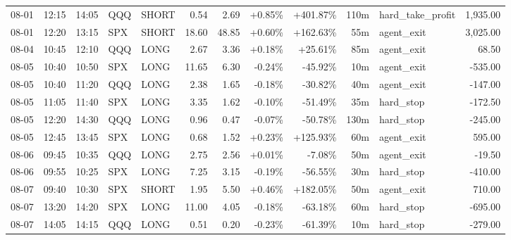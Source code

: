 \documentclass[11pt,a4paper,twoside]{article}
\begin{document}
\begin{center}
\begin{longtable}{>{\color{txtmain}}l l l l l r r r r r >{\color{txtmain}}l r}
08-01 & 12:15 & 14:05 & QQQ & SHORT & 0.54 & 2.69 & \textcolor{wingreen}{+0.85\%} & \textcolor{wingreen}{+401.87\%} & 110m & hard\_take\_profit & \textcolor{wingreen}{1,935.00} \\
08-01 & 12:20 & 13:15 & SPX & SHORT & 18.60 & 48.85 & \textcolor{wingreen}{+0.60\%} & \textcolor{wingreen}{+162.63\%} & 55m & agent\_exit & \textcolor{wingreen}{3,025.00} \\
08-04 & 10:45 & 12:10 & QQQ & LONG & 2.67 & 3.36 & \textcolor{wingreen}{+0.18\%} & \textcolor{wingreen}{+25.61\%} & 85m & agent\_exit & \textcolor{wingreen}{68.50} \\
08-05 & 10:40 & 10:50 & SPX & LONG & 11.65 & 6.30 & \textcolor{lossred}{-0.24\%} & \textcolor{lossred}{-45.92\%} & 10m & agent\_exit & \textcolor{lossred}{-535.00} \\
08-05 & 10:40 & 11:20 & QQQ & LONG & 2.38 & 1.65 & \textcolor{lossred}{-0.18\%} & \textcolor{lossred}{-30.82\%} & 40m & agent\_exit & \textcolor{lossred}{-147.00} \\
08-05 & 11:05 & 11:40 & SPX & LONG & 3.35 & 1.62 & \textcolor{lossred}{-0.10\%} & \textcolor{lossred}{-51.49\%} & 35m & hard\_stop & \textcolor{lossred}{-172.50} \\
08-05 & 12:20 & 14:30 & QQQ & LONG & 0.96 & 0.47 & \textcolor{lossred}{-0.07\%} & \textcolor{lossred}{-50.78\%} & 130m & hard\_stop & \textcolor{lossred}{-245.00} \\
08-05 & 12:45 & 13:45 & SPX & LONG & 0.68 & 1.52 & \textcolor{wingreen}{+0.23\%} & \textcolor{wingreen}{+125.93\%} & 60m & agent\_exit & \textcolor{wingreen}{595.00} \\
08-06 & 09:45 & 10:35 & QQQ & LONG & 2.75 & 2.56 & \textcolor{wingreen}{+0.01\%} & \textcolor{lossred}{-7.08\%} & 50m & agent\_exit & \textcolor{lossred}{-19.50} \\
08-06 & 09:55 & 10:25 & SPX & LONG & 7.25 & 3.15 & \textcolor{lossred}{-0.19\%} & \textcolor{lossred}{-56.55\%} & 30m & hard\_stop & \textcolor{lossred}{-410.00} \\
08-07 & 09:40 & 10:30 & SPX & SHORT & 1.95 & 5.50 & \textcolor{wingreen}{+0.46\%} & \textcolor{wingreen}{+182.05\%} & 50m & agent\_exit & \textcolor{wingreen}{710.00} \\
08-07 & 13:20 & 14:20 & SPX & LONG & 11.00 & 4.05 & \textcolor{lossred}{-0.18\%} & \textcolor{lossred}{-63.18\%} & 60m & hard\_stop & \textcolor{lossred}{-695.00} \\
08-07 & 14:05 & 14:15 & QQQ & LONG & 0.51 & 0.20 & \textcolor{lossred}{-0.23\%} & \textcolor{lossred}{-61.39\%} & 10m & hard\_stop & \textcolor{lossred}{-279.00} \\

\end{longtable}
\end{center}
\end{document}
